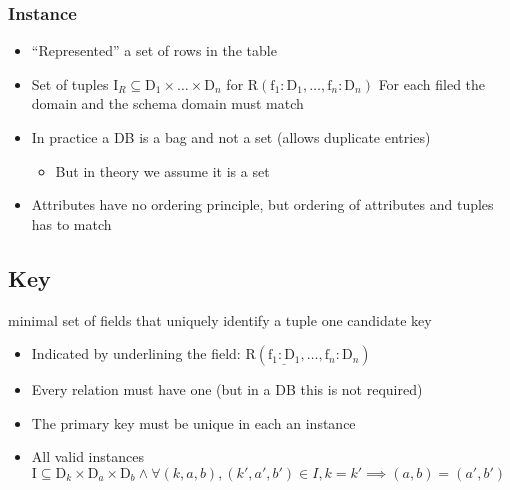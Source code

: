 \subsubsection{Instance}
\begin{itemize}
    \item ``Represented'' a set of rows in the table
    \item Set of tuples $\text{I}_R \subseteq \text{D}_1 \times \dots \times \text{D}_n$ for $\text{R}(\text{f}_1: \text{D}_1, \dots, \text{f}_n:\text{D}_n)$
     For each filed the domain and the schema domain must match
    \item In practice a DB is a bag and not a set (allows duplicate entries)
        \begin{itemize}
            \item But in theory we assume it is a set
        \end{itemize}
    \item Attributes have no ordering principle, but ordering of attributes and tuples has to match
\end{itemize}

\subsection{Key}
\begin{itemize}
     minimal set of fields that uniquely identify a tuple
     one candidate key
        \begin{itemize}
            \item Indicated by underlining the field: $\text{R}(\underline{\text{f}_1: \text{D}_1}, \dots, \text{f}_n:\text{D}_n)$
            \item Every relation must have one (but in a DB this is not required)
        \end{itemize}
        \begin{itemize}
            \item The primary key must be unique in each an instance
            \item All valid instances $\text{I} \subseteq \text{D}_k \times \text{D}_a \times \text{D}_b \wedge \forall (k, a, b), (k', a', b') \in I, k = k' \implies (a, b) = (a', b')$
        \end{itemize}
\end{itemize}
